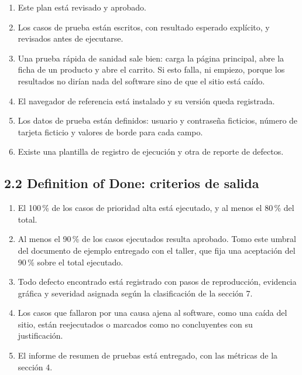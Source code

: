 \documentclass[11pt,a4paper]{article}
\begin{document}
\begin{enumerate}[label=E\arabic*.]
  \item Este plan está revisado y aprobado.
  \item Los casos de prueba están escritos, con resultado esperado explícito, y
        revisados antes de ejecutarse.
  \item Una prueba rápida de sanidad sale bien: carga la página principal, abre la
        ficha de un producto y abre el carrito. Si esto falla, ni empiezo, porque
        los resultados no dirían nada del software sino de que el sitio está
        caído.
  \item El navegador de referencia está instalado y su versión queda registrada.
  \item Los datos de prueba están definidos: usuario y contraseña ficticios,
        número de tarjeta ficticio y valores de borde para cada campo.
  \item Existe una plantilla de registro de ejecución y otra de reporte de
        defectos.
\end{enumerate}

\subsection*{2.2 Definition of Done: criterios de salida}

\begin{enumerate}[label=S\arabic*.]
  \item El 100\,\% de los casos de prioridad alta está ejecutado, y al menos el
        80\,\% del total.
  \item Al menos el 90\,\% de los casos ejecutados resulta aprobado. Tomo este
        umbral del documento de ejemplo entregado con el taller, que fija una
        aceptación del 90\,\% sobre el total ejecutado.
  \item Todo defecto encontrado está registrado con pasos de reproducción,
        evidencia gráfica y severidad asignada según la clasificación de la
        sección 7.
  \item Los casos que fallaron por una causa ajena al software, como una caída del
        sitio, están reejecutados o marcados como no concluyentes con su
        justificación.
  \item El informe de resumen de pruebas está entregado, con las métricas de la
        sección 4.
\end{enumerate}
\end{document}
